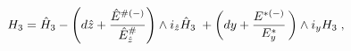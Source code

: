 \begin{equation}
\label{Td-HH1} 
H_3 = \hat{H}_3 
-  \left(d\hat{z} + 
{\hat{E}^{ {\#}(-)}\over \hat{E}_{\hat{z}}^{ {\#}}} 
\right)\wedge i_{\hat{z}} \hat{H}_3 \; + 
 \left(dy +  {{E}^{ {*}(-)}\over {E}_y^{ {*}}} \,
\right)\wedge i_y H_3  \; , 
\end{equation}

